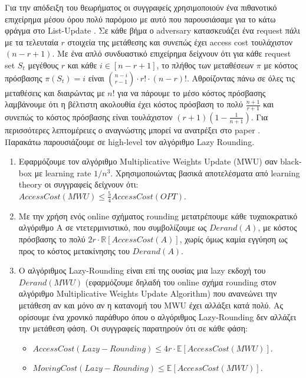 Για την απόδειξη του θεωρήματος οι συγγραφείς χρησιμοποιούν ένα πιθανοτικό επιχείρημα μέσου όρου πολύ παρόμοιο με αυτό που παρουσιάσαμε για το κάτω φράγμα στο List-Update \cite{ST85}. Σε κάθε βήμα ο adversary κατασκευάζει ένα request πάλι με τα τελευταία $r$ στοιχεία της μετάθεσης και συνεπώς έχει access cost τουλάχιστον $(n-r+1)$. Με ένα απλό συνδυαστικό επιχείρημα δείχνουν ότι για κάθε request set $S_t$ μεγέθους $r$ και κάθε $i \in [n-r+1]$, το πλήθος των μεταθέσεων $\pi$ με κόστος πρόσβασης $\pi(S_t)=i$ είναι $\binom{n-i}{r-1} \cdot r! \cdot (n-r)!$. Αθροίζοντας πάνω σε όλες τις μεταθέσεις και διαιρώντας με $n!$ για να πάρουμε το μέσο κόστος πρόσβασης λαμβάνουμε ότι η βέλτιστη ακολουθία έχει κόστος πρόσβαση το πολύ $\frac{n+1}{r+1}$ και συνεπώς το κόστος πρόσβασης είναι τουλάχιστον $(r+1)(1 - \frac{1}{n+1})$. Για περισσότερες λεπτομέρειες ο αναγνώστης μπορεί να ανατρέξει στο paper \cite{FKKSV20}. \\

\noindent
Παρακάτω παρουσιάζουμε σε high-level τον αλγόριθμο Lazy Rounding. \\

\begin{enumerate}
    \item Εφαρμόζουμε τον αλγόριθμο Multiplicative Weights Update (MWU) σαν black-box με learning rate $1/n^3$. Χρησιμοποιώντας βασικά αποτελέσματα από learning theory οι συγγραφείς δείχνουν ότι: $AccessCost(MWU) \leq \frac{5}{4} AccessCost(OPT)$.
    
    \item Με την χρήση ενός online σχήματος rounding μετατρέπουμε κάθε τυχαιοκρατικό αλγόριθμο A σε ντετερμινιστικό, που συμβολίζουμε ως $Derand(A)$, με κόστος πρόσβασης το πολύ $2r \cdot \mathbb{R}[AccessCost(A)]$, χωρίς όμως καμία εγγύηση ως προς το κόστος μετακίνησης του $Derand(A)$.
    
    \item Ο αλγόριθμος Lazy-Rounding είναι επί της ουσίας μια lazy εκδοχή του $Derand(MWU)$ (εφαρμόζουμε δηλαδή του online σχήμα rounding στον αλγόριθμο Multiplicative Weights Update Algorithm) που ανανεώνει την μετάθεση αν και μόνο αν η κατανομή του MWU έχει αλλάξει κατά πολύ. Ας ορίσουμε ένα χρονικό παράθυρο όπου ο αλγόριθμος Lazy-Rounding δεν αλλάζει την μετάθεση φάση. Οι συγγραφείς παρατηρούν ότι σε κάθε φάση:
        \begin{itemize}
            \item $AccessCost(Lazy-Rounding) \leq 4r \cdot \mathbb{E}[AccessCost(MWU)]$.
            \item $MovingCost(Lazy-Rounding) \leq \mathbb{E}[AccessCost(MWU)]$.
        \end{itemize}
\end{enumerate}

